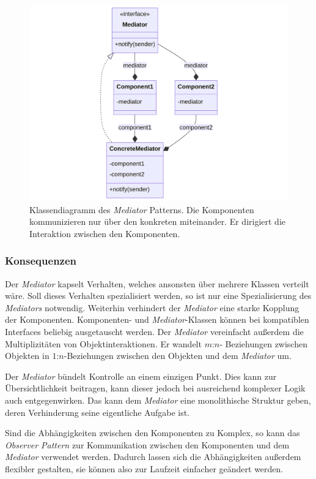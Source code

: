 \begin{figure}[!ht]
	\centering
	\includegraphics[width=0.75\linewidth]{images/patterns/mediator-class.png}
	\caption{Klassendiagramm des \emph{Mediator} Patterns. Die Komponenten kommunizieren nur über den konkreten  miteinander. Er dirigiert die Interaktion zwischen den Komponenten. \cite{skobeleva_mediator_2023}}
	\label{fig:mediator-class}
\end{figure}

\subsubsection*{Konsequenzen}

Der \emph{Mediator} kapselt Verhalten, welches ansonsten über mehrere Klassen verteilt wäre. Soll dieses Verhalten spezialisiert werden, so ist nur eine Spezialisierung des \emph{Mediators} notwendig. Weiterhin verhindert der \emph{Mediator} eine starke Kopplung der Komponenten. Komponenten- und \emph{Mediator}-Klassen können bei kompatiblen Interfaces beliebig ausgetauscht werden. Der \emph{Mediator} vereinfacht außerdem die Multiplizitäten von Objektinteraktionen. Er wandelt $m$:$n$- Beziehungen zwischen Objekten in $1$:$n$-Beziehungen zwischen den Objekten und dem \emph{Mediator} um.

Der \emph{Mediator} bündelt Kontrolle an einem einzigen Punkt. Dies kann zur Übersichtlichkeit beitragen, kann dieser jedoch bei ausreichend komplexer Logik auch entgegenwirken. Das kann dem \emph{Mediator} eine monolithische Struktur geben, deren Verhinderung seine eigentliche Aufgabe ist.

Sind die Abhängigkeiten zwischen den Komponenten zu Komplex, so kann das \emph{Observer Pattern} zur Kommunikation zwischen den Komponenten und dem \emph{Mediator} verwendet werden. Dadurch lassen sich die Abhängigkeiten außerdem flexibler gestalten, sie können also zur Laufzeit einfacher geändert werden. \cite{gamma_design_1995}